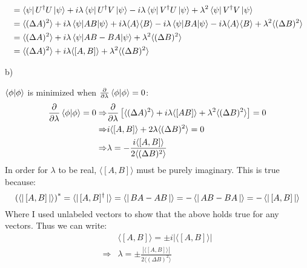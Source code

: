 \documentclass[a4paper,12pt]{article}
\begin{document}
\begin{minipage}[t]{0.90\textwidth}
\begin{minipage}[t]{\textwidth}
\begin{align*}
                         &=  \bra{\psi} U^\dagger U\ket{\psi} + i\lambda \bra{\psi} U^\dagger V\ket{\psi}- i\lambda\bra{\psi}V^\dagger U\ket{\psi} + \lambda^2\bra{\psi}V^\dagger  V \ket{\psi}\\
                         &=  \langle (\Delta A)^2 \rangle + i\lambda \braket{\psi | AB |\psi} + i\lambda \langle A \rangle \langle B \rangle - i\lambda\braket {\psi| B A | \psi} - i\lambda \langle A \rangle \langle B \rangle+ \lambda^2\langle (\Delta B)^2 \rangle\\
                         &=  \langle (\Delta A)^2 \rangle + i\lambda \braket{\psi | AB - BA|\psi} + \lambda^2\langle (\Delta B)^2 \rangle\\
                         &=  \langle (\Delta A)^2 \rangle + i\lambda \langle [A,B]\rangle + \lambda^2\langle (\Delta B)^2 \rangle\\
    \end{align*}
  \end{minipage}

  b)
  \begin{minipage}[t]{\textwidth}
    $\braket{\phi|\phi}$ is minimized when $\frac{\partial}{\partial \lambda} \braket{\phi|\phi} = 0$:
    \begin{align*}
                  \frac{\partial}{\partial \lambda} \braket{\phi|\phi} = 0
      \Rightarrow & \frac{\partial}{\partial \lambda} \left[\langle (\Delta A)^2 \rangle + i\lambda \langle [AB]\rangle + \lambda^2\langle (\Delta B)^2 \rangle\right] = 0\\
      \Rightarrow & i\langle [A,B]\rangle + 2 \lambda \langle (\Delta B)^2 \rangle = 0\\
      \Rightarrow &  \lambda = - \frac{i\langle [A,B]\rangle }{2 \langle (\Delta B)^2 \rangle }
    \end{align*}
    In order for $\lambda$ to be real, $\langle [A,B]\rangle$ must be purely imaginary.
    This is true because:
    \begin{equation*}
      \left(\bra{} [A, B] \ket{}\right)^* = \bra{} [A, B]^\dagger \ket{} = \bra{} BA - AB \ket{} = -\bra{} AB - BA \ket{} = -\bra{} [A, B] \ket{}
    \end{equation*}
    Where I used unlabeled vectors to show that the above holds true for any vectors.
    Thus we can write:
    \begin{align*}
        & \langle[A, B] \rangle = \pm i |\langle[A, B] \rangle|\\
      \Rightarrow & \lambda = \pm \frac{|\langle[A, B] \rangle|}{2\langle (\Delta B)^2 \rangle }
    \end{align*}
  \end{minipage}
\end{minipage}
\end{document}
